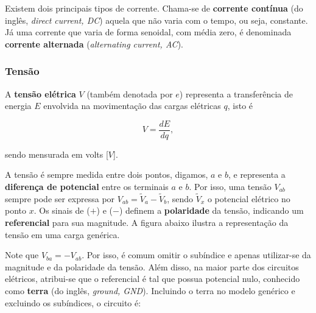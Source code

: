 \documentclass{article}
\numberwithin{equation}{section}
\let\dfr\dfrac
\begin{document}
Existem dois principais tipos de corrente. Chama-se de \textbf{corrente contínua} (do inglês, \textit{direct current, DC}) aquela que não varia com o tempo, ou seja, constante. Já uma corrente que varia de forma senoidal, com média zero, é denominada \textbf{corrente alternada} (\textit{alternating current, AC}).

\subsubsection{Tensão}
\label{subsubsec:tensão}

A \textbf{tensão elétrica} $V$ (também denotada por $e$) representa a transferência de energia $E$ envolvida na movimentação das cargas elétricas $q$, isto é

\begin{equation}
    V = \dfr{dE}{dq},
\end{equation}

\noindent sendo mensurada em volts [$V$].

A tensão é sempre medida entre dois pontos, digamos, $a$ e $b$, e representa a \textbf{diferença de potencial} entre os terminais $a$ e $b$. Por isso, uma tensão $V_{ab}$ sempre pode ser expressa por $V_{ab}=\tilde{V}_a - \tilde{V}_b$, sendo $\tilde{V}_x$ o potencial elétrico no ponto $x$. Os sinais de ($+$) e ($-$) definem a \textbf{polaridade} da tensão, indicando um \textbf{referencial} para sua magnitude. A figura abaixo ilustra a representação da tensão em uma carga genérica.

\begin{center}
\end{center}

\noindent Note que $V_{ba} = -V_{ab}$. Por isso, é comum omitir o subíndice e apenas utilizar-se da magnitude e da polaridade da tensão. Além disso, na maior parte dos circuitos elétricos, atribui-se que o referencial é tal que possua potencial nulo, conhecido como \textbf{terra} (do inglês, \textit{ground, GND}). Incluindo o terra no modelo genérico e excluindo os subíndices, o circuito é:

\vspace{2mm}

\begin{center}
\end{center}
\end{document}
